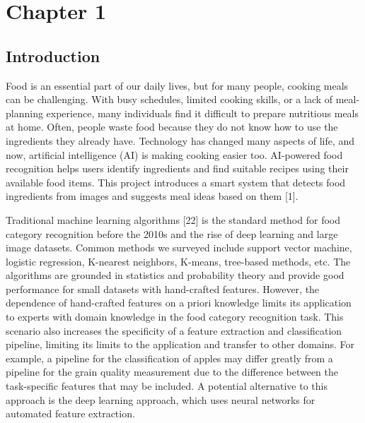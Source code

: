 \documentclass[12pt, a4paper]{article} %
\begin{document}
\section*{Chapter 1}
\subsection*{Introduction}

Food is an essential part of our daily lives, but for many people, cooking meals can be challenging. With busy schedules, limited cooking skills, or a lack of meal-planning experience, many individuals find it difficult to prepare nutritious meals at home. Often, people waste food because they do not know how to use the ingredients they already have. Technology has changed many aspects of life, and now, artificial intelligence (AI) is making cooking easier too. AI-powered food recognition helps users identify ingredients and find suitable recipes using their available food items. This project introduces a smart system that detects food ingredients from images and suggests meal ideas based on them [1].\vspace{1 cm}

Traditional machine learning algorithms [22] is the standard method for food category recognition before the 2010s and the rise of deep learning and large image datasets. Common methods we surveyed include support vector machine, logistic regression, K-nearest neighbors, K-means, tree-based methods, etc. The algorithms are grounded in statistics and probability theory and provide good performance for small datasets with hand-crafted features. However, the dependence of hand-crafted features on a priori knowledge limits its application to experts with domain knowledge in the food category recognition task. This scenario also increases the specificity of a feature extraction and classification pipeline, limiting its limits to the application and transfer to other domains. For example, a pipeline for the classification of apples may differ greatly from a pipeline for the grain quality measurement due to the difference between the task-specific features that may be included. A potential alternative to this approach is the deep learning approach, which uses neural networks for automated feature extraction.\vspace{1 cm}
\end{document}
